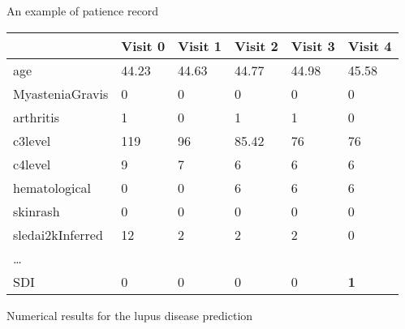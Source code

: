 
\begin{frame}{An example of patience record}
\begin{table}[H]
	\centering
	\begin{tabular}{ C{2.5cm} | C{1cm} C{1cm} C{1cm} C{1cm} C{1cm}}
		& Visit 0 & Visit 1 & Visit 2 & Visit 3 & Visit 4 \\
		\hline
		age & 44.23 & 44.63 & 44.77 & 44.98 & 45.58 \\
		MyasteniaGravis & 0 & 0 & 0 & 0 & 0 \\
		arthritis & 1 & 0 & 1 & 1 & 0 \\
		c3level & 119 & 96 & 85.42 & 76 & 76 \\
		c4level & 9 & 7 & 6 & 6 & 6 \\
		hematological & 0 & 0 & 6 & 6 & 6 \\
		skinrash & 0 & 0 & 0 & 0 & 0 \\
		sledai2kInferred & 12 & 2 & 2 & 2 & 0 \\
		\dots & & & & & \\
		\hline
		SDI & 0 & 0 & 0 & 0 & \textbf{1}\\
	\end{tabular}
\end{table}	
\end{frame}

\begin{frame}{Numerical results for the lupus disease prediction}

\begin{figure}
	\centering
\end{figure}

\end{frame}


 
